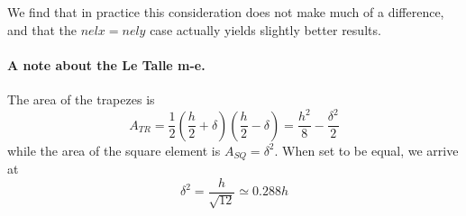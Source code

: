 We find that in practice this consideration does not make much of a difference,
and that the $nelx=nely$ case actually yields slightly better results.

\paragraph{A note about the Le Talle m-e.}

\begin{center}
\end{center}

The area of the trapezes is 
\[
A_{TR}=\frac12 (\frac{h}{2}+\delta) (\frac{h}{2}-\delta) = \frac{h^2}{8}- \frac{\delta^2}{2}
\]
while the area of the square element is $A_{SQ}=\delta^2$.
When set to be equal, we arrive at
\[
\delta^2 = \frac{h}{\sqrt{12}} \simeq 0.288 h
\]






